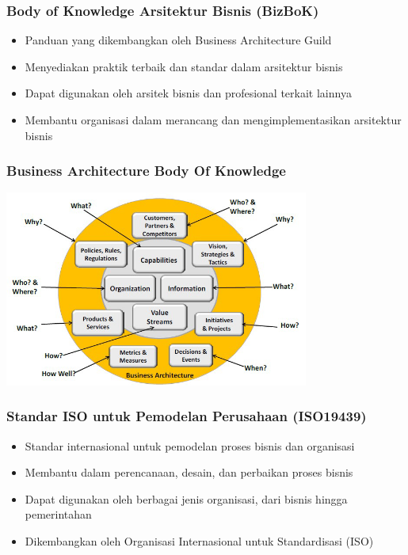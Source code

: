 \documentclass[aspectratio=169, table]{beamer}
\begin{document}
	\begin{frame}
		\frametitle{Body of Knowledge Arsitektur Bisnis (BizBoK)}
		\begin{itemize}
			\item Panduan yang dikembangkan oleh Business Architecture Guild
			\item Menyediakan praktik terbaik dan standar dalam arsitektur bisnis
			\item Dapat digunakan oleh arsitek bisnis dan profesional terkait lainnya
			\item Membantu organisasi dalam merancang dan mengimplementasikan arsitektur bisnis
		\end{itemize}
	\end{frame}
	
	{
		\begin{frame}
			\frametitle{Business Architecture Body Of Knowledge}
			\begin{center}
				\includegraphics[width=0.75\textwidth]{../figures/bizbok}
			\end{center}
		\end{frame}
	}
	
	\begin{frame}
		\frametitle{Standar ISO untuk Pemodelan Perusahaan (ISO19439)}
		\begin{itemize}
			\item Standar internasional untuk pemodelan proses bisnis dan organisasi
			\item Membantu dalam perencanaan, desain, dan perbaikan proses bisnis
			\item Dapat digunakan oleh berbagai jenis organisasi, dari bisnis hingga pemerintahan
			\item Dikembangkan oleh Organisasi Internasional untuk Standardisasi (ISO)
		\end{itemize}
	\end{frame}
	
\end{document}
